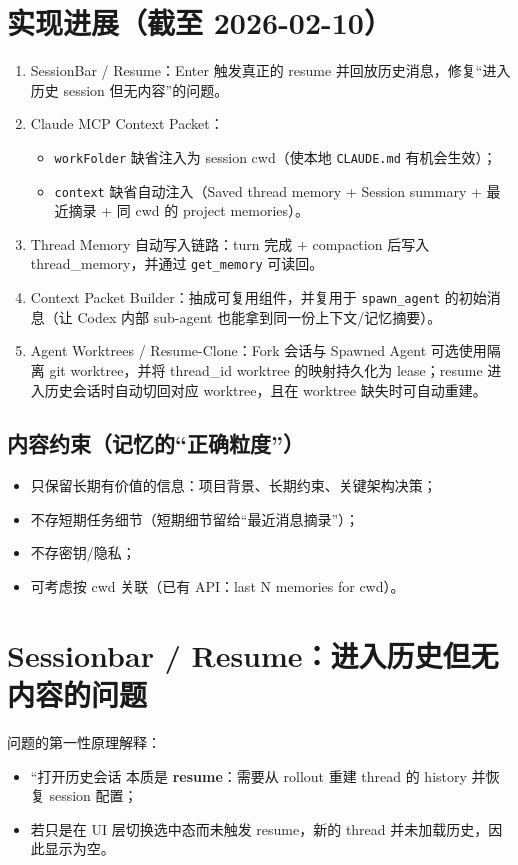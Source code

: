 \documentclass[UTF8,11pt]{ctexart}
\begin{document}
\section{实现进展（截至 2026-02-10）}
\begin{enumerate}[nosep]
  \item SessionBar / Resume：Enter 触发真正的 resume 并回放历史消息，修复“进入历史 session 但无内容”的问题。
  \item Claude MCP Context Packet：
    \begin{itemize}[nosep]
      \item \texttt{workFolder} 缺省注入为 session cwd（使本地 \texttt{CLAUDE.md} 有机会生效）；
      \item \texttt{context} 缺省自动注入（Saved thread memory + Session summary + 最近摘录 + 同 cwd 的 project memories）。
    \end{itemize}
  \item Thread Memory 自动写入链路：turn 完成 + compaction 后写入 thread\_memory，并通过 \texttt{get\_memory} 可读回。
  \item Context Packet Builder：抽成可复用组件，并复用于 \texttt{spawn\_agent} 的初始消息（让 Codex 内部 sub-agent 也能拿到同一份上下文/记忆摘要）。
  \item Agent Worktrees / Resume-Clone：Fork 会话与 Spawned Agent 可选使用隔离 git worktree，并将 thread\_id \textrightarrow worktree 的映射持久化为 lease；resume 进入历史会话时自动切回对应 worktree，且在 worktree 缺失时可自动重建。
\end{enumerate}

\subsection{内容约束（记忆的“正确粒度”）}
\begin{itemize}[nosep]
  \item 只保留长期有价值的信息：项目背景、长期约束、关键架构决策；
  \item 不存短期任务细节（短期细节留给“最近消息摘录”）；
  \item 不存密钥/隐私；
  \item 可考虑按 cwd 关联（已有 API：last N memories for cwd）。
\end{itemize}

\section{Sessionbar / Resume：进入历史但无内容的问题}
问题的第一性原理解释：
\begin{itemize}[nosep]
  \item ``打开历史会话 本质是 \textbf{resume}：需要从 rollout 重建 thread 的 history 并恢复 session 配置；
  \item 若只是在 UI 层切换选中态而未触发 resume，新的 thread 并未加载历史，因此显示为空。
\end{itemize}
\end{document}
